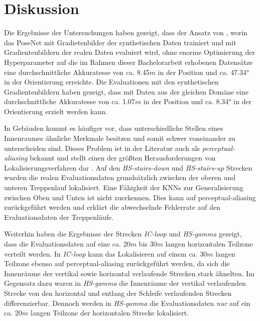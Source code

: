 
\section{Diskussion}
\label{sec:kapitel_5}


Die Ergebnisse der Untersuchungen haben gezeigt, dass der Ansatz von \citet{acharyaBIMPoseNetIndoorCamera2019}, worin das PoseNet mit Gradietenbilder der synthetischen Daten trainiert und mit Gradientenbildern der realen Daten evaluiert wird, ohne enorme Optimierung der Hyperparameter auf die im Rahmen dieser Bachelorarbeit erhobenen Datensätze eine durchschnittliche Akkuratesse von ca. 8.45$m$ in der Position und ca. 47.34° in der Orientierung erreichte. Die Evaluationen mit den synthetischen Gradientenbildern haben gezeigt, dass mit Daten aus der gleichen Domäne eine durchschnittliche Akkuratesse von ca. 1.07$m$ in der Position und ca. 8.34° in der Orientierung erzielt werden kann. 

In Gebäuden kommt es häufiger vor, dass unterschiedliche Stellen eines Innenraumes ähnliche Merkmale besitzen und somit schwer voneinander zu unterscheiden sind. Dieses Problem ist in der Literatur auch als \textit{perceptual-aliasing} bekannt und stellt einen der größten Herausforderungen von Lokalisierungsverfahren dar \cite{lowryVisualPlaceRecognition2016}. Auf den \textit{HS-stairs-down} und \textit{HS-stairs-up} Strecken wurden die realen Evaluationsdaten grundsätzlich zwischen der oberen und unteren Treppenlauf lokalisiert. Eine Fähigkeit der KNNs zur Generalisierung zwischen Oben und Unten ist nicht zuerkennen. Dies kann auf perceptual-aliasing zurückgeführt werden und erklärt die abwechselnde Fehlerrate auf den Evaluationsdaten der Treppenläufe.

Weiterhin haben die Ergebnisse der Strecken \textit{IC-loop} und \textit{HS-gamma} gezeigt, dass die Evaluationsdaten auf eine ca. 20$m$ bis 30$m$ langen horizontalen Teilzone verteilt werden. In \textit{IC-loop} kann das Lokalisieren auf einem ca. 30$m$ langen Teilzone ebenso auf perceptual-aliasing zurückgeführt werden, da sich die Innenräume der vertikal sowie horizontal verlaufende Strecken stark ähnelten. Im Gegensatz dazu waren in \textit{HS-gamma} die Innenräume der vertikal verlaufenden Strecke von den horizontal und entlang der Schleife verlaufenden Strecken differenzierbar. Dennoch werden in \textit{HS-gamma} die Evaluationsdaten \textit{nur} auf ein ca. 20$m$ langen Teilzone der horizontalen Strecke lokalisiert.

